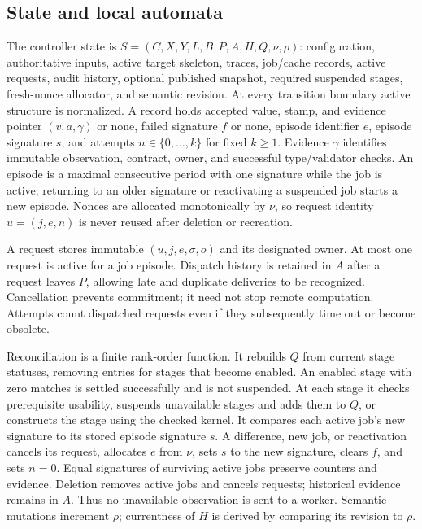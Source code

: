 \documentclass[pdflatex,sn-mathphys-num]{sn-jnl}
\theoremstyle{thmstyleone}
\theoremstyle{thmstylethree}
\theoremstyle{thmstyletwo}
\newcommand{\Sig}{\sigma}
\begin{document}
\subsection{State and local automata}
The controller state is $S=(C,X,Y,L,B,P,A,H,Q,\nu,\rho)$: configuration, authoritative inputs, active target skeleton, traces, job/cache records, active requests, audit history, optional published snapshot, required suspended stages, fresh-nonce allocator, and semantic revision. At every transition boundary active structure is normalized. A record holds accepted value, stamp, and evidence pointer $(v,a,\gamma)$ or none, failed signature $f$ or none, episode identifier $e$, episode signature $s$, and attempts $n\in\{0,\ldots,k\}$ for fixed $k\geq1$. Evidence $\gamma$ identifies immutable observation, contract, owner, and successful type/validator checks. An episode is a maximal consecutive period with one signature while the job is active; returning to an older signature or reactivating a suspended job starts a new episode. Nonces are allocated monotonically by $\nu$, so request identity $u=(j,e,n)$ is never reused after deletion or recreation.

A request stores immutable $(u,j,e,\Sig,o)$ and its designated owner. At most one request is active for a job episode. Dispatch history is retained in $A$ after a request leaves $P$, allowing late and duplicate deliveries to be recognized. Cancellation prevents commitment; it need not stop remote computation. Attempts count dispatched requests even if they subsequently time out or become obsolete.

Reconciliation is a finite rank-order function. It rebuilds $Q$ from current stage statuses, removing entries for stages that become enabled. An enabled stage with zero matches is settled successfully and is not suspended. At each stage it checks prerequisite usability, suspends unavailable stages and adds them to $Q$, or constructs the stage using the checked kernel. It compares each active job's new signature to its stored episode signature $s$. A difference, new job, or reactivation cancels its request, allocates $e$ from $\nu$, sets $s$ to the new signature, clears $f$, and sets $n=0$. Equal signatures of surviving active jobs preserve counters and evidence. Deletion removes active jobs and cancels requests; historical evidence remains in $A$. Thus no unavailable observation is sent to a worker. Semantic mutations increment $\rho$; currentness of $H$ is derived by comparing its revision to $\rho$.
\end{document}
